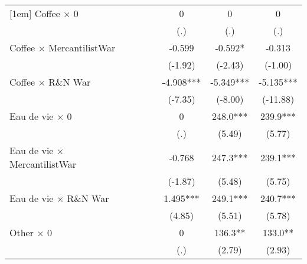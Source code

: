 {\begin{tabular}{l*{6}{c}}
[1em]
Coffee $\times$ 0   &                     &                     &                     &           0         &           0         &           0         \\
                    &                     &                     &                     &         (.)         &         (.)         &         (.)         \\
[1em]
Coffee $\times$ MercantilistWar&                     &                     &                     &      -0.599         &      -0.592*  &      -0.313         \\
                    &                     &                     &                     &     (-1.92)         &     (-2.43)         &     (-1.00)         \\
[1em]
Coffee $\times$ R\&N War&                     &                     &                     &      -4.908***&      -5.349***&      -5.135***\\
                    &                     &                     &                     &     (-7.35)         &     (-8.00)         &    (-11.88)         \\
[1em]
Eau de vie $\times$ 0&                     &                     &                     &           0         &       248.0***&       239.9***\\
                    &                     &                     &                     &         (.)         &      (5.49)         &      (5.77)         \\
[1em]
Eau de vie $\times$ MercantilistWar&                     &                     &                     &      -0.768         &       247.3***&       239.1***\\
                    &                     &                     &                     &     (-1.87)         &      (5.48)         &      (5.75)         \\
[1em]
Eau de vie $\times$ R\&N War&                     &                     &                     &       1.495***&       249.1***&       240.7***\\
                    &                     &                     &                     &      (4.85)         &      (5.51)         &      (5.78)         \\
[1em]
Other $\times$ 0    &                     &                     &                     &           0         &       136.3** &       133.0** \\
                    &                     &                     &                     &         (.)         &      (2.79)         &      (2.93)         \\

\end{tabular}}
